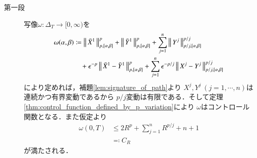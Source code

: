 	\begin{prf}\mbox{}
		\begin{description}
			\item[第一段]
				写像$\omega:\Delta_T \longrightarrow [0,\infty)$を
				\begin{align}
					\omega(\alpha,\beta) &\coloneqq 
					\left\|\, \bar{X}^1\, \right\|_{p,[\alpha,\beta]}^p + \left\|\, \bar{Y}^1\, \right\|_{p,[\alpha,\beta]}^p
					+ \sum_{j=1}^n \left\|\, Y^j\, \right\|_{p/j,[\alpha,\beta]}^{p/j} \\
					&\quad + \epsilon^{-p} \left\|\, \bar{X}^1 - \bar{Y}^1\, \right\|_{p,[\alpha,\beta]}^{p} 
					+ \sum_{j=1}^{n} \epsilon^{-p/j} \left\|\, X^j - Y^j\, \right\|_{p/j,[\alpha,\beta]}^{p/j}
				\end{align}
				により定めれば，補題\ref{lem:signature_of_path}より
				$X^j,Y^j\ (j=1,\cdots,n)$は連続かつ有界変動であるから
				$p/j$変動は有限である．そして定理\ref{thm:control_function_defined_by_p_variation}により
				$\omega$はコントロール関数となる．また仮定より
				\begin{align}
					\omega(0,T) &\leq 2R^p + \sum_{j=1}^n R^{p/j} + n + 1 \\
					&\eqqcolon C_R
				\end{align}
				が満たされる．
				

\end{description}
\end{prf}

